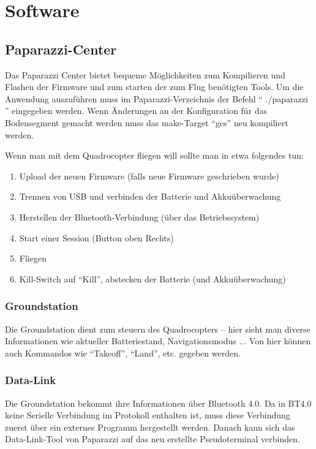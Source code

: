 \section{Software}

\subsection{Paparazzi-Center}

Das Paparazzi Center bietet bequeme Möglichkeiten zum Kompilieren und Flashen der Firmware und zum starten der zum Flug benötigten Tools.
Um die Anwendung auszuführen muss im Paparazzi-Verzeichnis der Befehl \enquote{ ./paparazzi } eingegeben werden.
Wenn Änderungen an der Konfiguration für das Bodensegment gemacht werden muss das make-Target \enquote{gcs} neu kompiliert werden.


Wenn man mit dem Quadrocopter fliegen will sollte man in etwa folgendes tun:
\begin{enumerate}
	\item Upload der neuen Firmware (falls neue Firmware geschrieben wurde)
	\item Trennen von USB und verbinden der Batterie und Akkuüberwachung
	\item Herstellen der Bluetooth-Verbindung (über das Betriebssystem)
	\item Start einer Session (Button oben Rechts)
	\item Fliegen
	\item Kill-Switch auf \enquote{Kill}, abstecken der Batterie (und Akkuüberwachung)
\end{enumerate}

\subsubsection{Groundstation}
Die Groundstation dient zum steuern des Quadrocopters – hier sieht man diverse Informationen wie aktueller Batteriestand, Navigationsmodus ...
Von hier können auch Kommandos wie \enquote{Takeoff}, \enquote{Land}, etc. gegeben werden.

\subsubsection{Data-Link}
Die Groundstation bekommt ihre Informationen über Bluetooth 4.0. Da in BT4.0 keine Serielle Verbindung im Protokoll enthalten ist, muss diese Verbindung zuerst über ein externes Programm hergestellt werden. Danach kann sich das Data-Link-Tool von Paparazzi auf das neu erstellte Pseudoterminal  verbinden.

